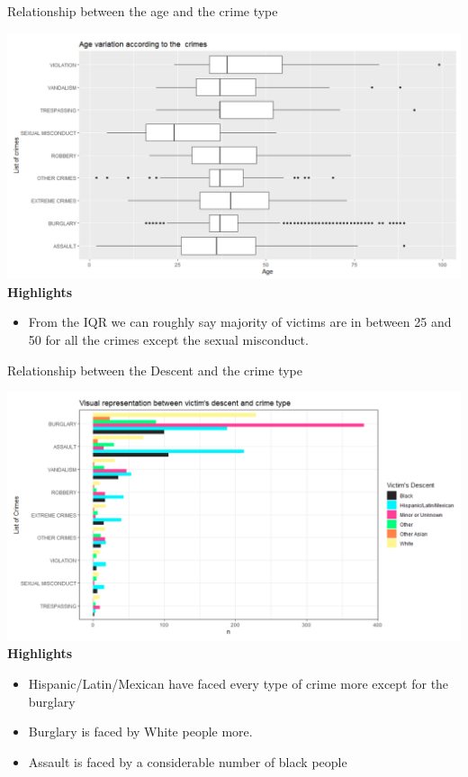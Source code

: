 \documentclass{beamer}\usepackage[]{graphicx}\usepackage[]{xcolor}
\makeatletter
\def\maxwidth{ %
  \ifdim\Gin@nat@width>\linewidth
    \linewidth
  \else
    \Gin@nat@width
  \fi
}
\newenvironment{knitrout}{}{} %
\makeatother
\begin{document}
\begin{frame}[fragile]{Relationship between the age and the crime type}

\begin{knitrout}
\color{fgcolor}
\includegraphics[width=\maxwidth]{figure/box_age.png} 
\end{knitrout}
\textbf{Highlights}
\begin{itemize}
\item From the IQR we can roughly say majority of victims are in between 25 and 50 for all the crimes except the sexual misconduct.

\end{itemize}
\end{frame}

\begin{frame}[fragile]{Relationship between the Descent and the crime type}

\begin{knitrout}
\color{fgcolor}
\includegraphics[width=\maxwidth]{figure/descent.png} 
\end{knitrout}
\textbf{Highlights}
\begin{itemize}
\item Hispanic/Latin/Mexican have faced every type of crime more except for the burglary
\item Burglary is faced by White people more.
\item Assault is faced by a considerable number of black people
\end{itemize}
\end{frame}
\end{document}

